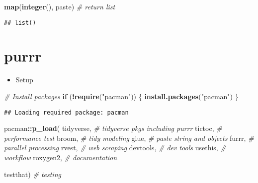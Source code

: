 \documentclass[
]{book}
\newenvironment{Shaded}{\begin{snugshade}}{\end{snugshade}}
\newcommand{\CommentTok}[1]{\textcolor[rgb]{0.56,0.35,0.01}{\textit{#1}}}
\newcommand{\ControlFlowTok}[1]{\textcolor[rgb]{0.13,0.29,0.53}{\textbf{#1}}}
\newcommand{\KeywordTok}[1]{\textcolor[rgb]{0.13,0.29,0.53}{\textbf{#1}}}
\newcommand{\NormalTok}[1]{#1}
\newcommand{\OperatorTok}[1]{\textcolor[rgb]{0.81,0.36,0.00}{\textbf{#1}}}
\newcommand{\StringTok}[1]{\textcolor[rgb]{0.31,0.60,0.02}{#1}}
\providecommand{\tightlist}{%
  \setlength{\itemsep}{0pt}\setlength{\parskip}{0pt}}
\begin{document}
\begin{Shaded}
\begin{Highlighting}[]
\KeywordTok{map}\NormalTok{(}\KeywordTok{integer}\NormalTok{(), paste) }\CommentTok{\# return list}
\end{Highlighting}
\end{Shaded}

\begin{verbatim}
## list()
\end{verbatim}

\hypertarget{purrr}{%
\section{purrr}\label{purrr}}

\begin{itemize}
\tightlist
\item
  Setup
\end{itemize}

\begin{Shaded}
\begin{Highlighting}[]
\CommentTok{\# Install packages}
\ControlFlowTok{if}\NormalTok{ (}\OperatorTok{!}\KeywordTok{require}\NormalTok{(}\StringTok{"pacman"}\NormalTok{)) \{}
  \KeywordTok{install.packages}\NormalTok{(}\StringTok{"pacman"}\NormalTok{)}
\NormalTok{\}}
\end{Highlighting}
\end{Shaded}

\begin{verbatim}
## Loading required package: pacman
\end{verbatim}

\begin{Shaded}
\begin{Highlighting}[]
\NormalTok{pacman}\OperatorTok{::}\KeywordTok{p\_load}\NormalTok{(}
\NormalTok{  tidyverse, }\CommentTok{\# tidyverse pkgs including purrr}
\NormalTok{  tictoc, }\CommentTok{\# performance test}
\NormalTok{  broom, }\CommentTok{\# tidy modeling}
\NormalTok{  glue, }\CommentTok{\# paste string and objects}
\NormalTok{  furrr, }\CommentTok{\# parallel processing}
\NormalTok{  rvest, }\CommentTok{\# web scraping}
\NormalTok{  devtools, }\CommentTok{\# dev tools }
\NormalTok{  usethis, }\CommentTok{\# workflow     }
\NormalTok{  roxygen2, }\CommentTok{\# documentation }
            
\NormalTok{  testthat) }\CommentTok{\# testing }
\end{Highlighting}
\end{Shaded}
\end{document}
